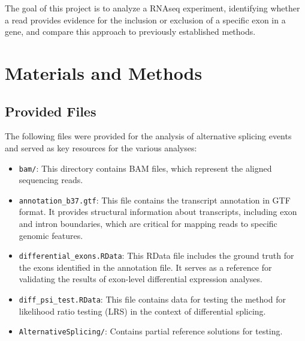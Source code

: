\documentclass{article}
\begin{document}
    The goal of this project is to analyze a RNAseq experiment, identifying whether a read provides evidence for the inclusion or exclusion of a specific exon in a gene, and compare this approach to previously established methods.


    \section{Materials and Methods}\label{sec:materials-and-methods}

    \subsection{Provided Files}\label{subsec:provided-files}

    The following files were provided for the analysis of alternative splicing events and served as key resources for the various analyses:

    \begin{itemize}
        \item \texttt{bam/}: This directory contains BAM files, which represent the aligned sequencing reads.
        \item \texttt{annotation\_b37.gtf}: This file contains the transcript annotation in GTF format. It provides structural information about transcripts, including exon and intron boundaries, which are critical for mapping reads to specific genomic features.

        \item \texttt{differential\_exons.RData}: This RData file includes the ground truth for the exons identified in the annotation file. It serves as a reference for validating the results of exon-level differential expression analyses.

        \item \texttt{diff\_psi\_test.RData}: This file contains data for testing the method for likelihood ratio testing (LRS) in the context of differential splicing.
        \item \texttt{AlternativeSplicing/}: Contains partial reference solutions for testing.
    \end{itemize}
\end{document}

